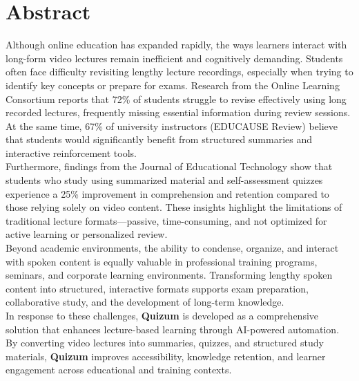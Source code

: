 \section*{\Huge Abstract}
Although online education has expanded rapidly, the ways learners interact with long-form video lectures remain inefficient and cognitively demanding. Students often face difficulty revisiting lengthy lecture recordings, especially when trying to identify key concepts or prepare for exams. Research from the Online Learning Consortium reports that 72\% of students struggle to revise effectively using long recorded lectures, frequently missing essential information during review sessions. At the same time, 67\% of university instructors (EDUCAUSE Review) believe that students would significantly benefit from structured summaries and interactive reinforcement tools.\\

Furthermore, findings from the Journal of Educational Technology show that students who study using summarized material and self-assessment quizzes experience a 25\% improvement in comprehension and retention compared to those relying solely on video content. These insights highlight the limitations of traditional lecture formats—passive, time-consuming, and not optimized for active learning or personalized review.\\

Beyond academic environments, the ability to condense, organize, and interact with spoken content is equally valuable in professional training programs, seminars, and corporate learning environments. Transforming lengthy spoken content into structured, interactive formats supports exam preparation, collaborative study, and the development of long-term knowledge.\\

In response to these challenges, \textbf{Quizum} is developed as a comprehensive solution that enhances lecture-based learning through AI-powered automation. By converting video lectures into summaries, quizzes, and structured study materials, \textbf{Quizum} improves accessibility, knowledge retention, and learner engagement across educational and training contexts.
